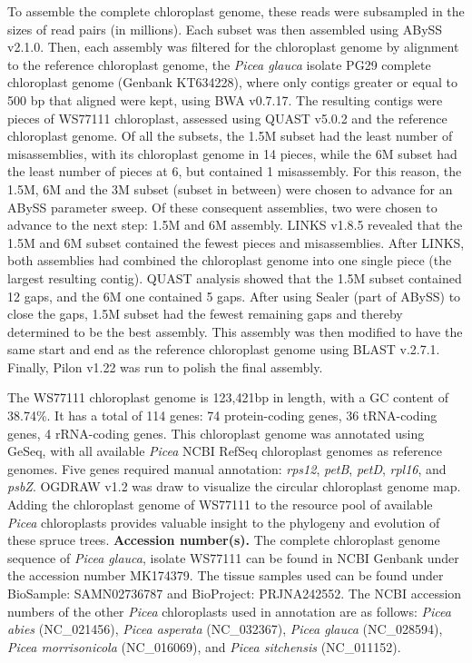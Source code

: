 \documentclass[titlepage,11pt, oneside]{article}   	%
\begin{document}
To assemble the complete chloroplast genome, these reads were subsampled in the sizes of read pairs (in millions). Each subset was then assembled using ABySS v2.1.0. Then, each assembly was filtered for the chloroplast genome by alignment to the reference chloroplast genome, the \textit{Picea glauca} isolate PG29 complete chloroplast genome (Genbank KT634228), where only contigs greater or equal to 500 bp that aligned were kept, using BWA v0.7.17. The resulting contigs were pieces of WS77111 chloroplast, assessed using QUAST v5.0.2 and the reference chloroplast genome. Of all the subsets, the 1.5M subset had the least number of misassemblies, with its chloroplast genome in 14 pieces, while the 6M subset had the least number of pieces at 6, but contained 1 misassembly. For this reason, the 1.5M, 6M and the 3M subset (subset in between) were chosen to advance for an ABySS parameter sweep. Of these consequent assemblies, two were chosen to advance to the next step: 1.5M and 6M assembly. LINKS v1.8.5 revealed that the 1.5M and 6M subset contained the fewest pieces and misassemblies. After LINKS, both assemblies had combined the chloroplast genome into one single piece (the largest resulting contig). QUAST analysis showed that the 1.5M subset contained 12 gaps, and the 6M one contained 5 gaps. After using Sealer (part of ABySS) to close the gaps, 1.5M subset had the fewest remaining gaps and thereby determined to be the best assembly. This assembly was then modified to have the same start and end as the reference chloroplast genome using BLAST v.2.7.1. Finally, Pilon v1.22 was run to polish the final assembly.
\newline
\par
The WS77111 chloroplast genome is 123,421bp in length, with a GC content of 38.74\%. It has a total of 114 genes: 74 protein-coding genes, 36 tRNA-coding genes, 4 rRNA-coding genes. This chloroplast genome was annotated using GeSeq, with all available \textit{Picea} NCBI RefSeq chloroplast genomes as reference genomes. Five genes required manual annotation: \textit{rps12}, \textit{petB}, \textit{petD}, \textit{rpl16}, and \textit{psbZ}. OGDRAW v1.2 was draw to visualize the circular chloroplast genome map. Adding the chloroplast genome of WS77111 to the resource pool of available \textit{Picea} chloroplasts provides valuable insight to the phylogeny and evolution of these spruce trees.
\newline
\newline
\textbf{Accession number(s).} The complete chloroplast genome sequence of \textit{Picea glauca}, isolate WS77111 can be found in NCBI Genbank under the accession number MK174379. The tissue samples used can be found under BioSample: SAMN02736787 and BioProject: PRJNA242552. The NCBI accession numbers of the other \textit{Picea} chloroplasts used in annotation are as follows: \textit{Picea abies} (NC\_021456), \textit{Picea asperata} (NC\_032367), \textit{Picea glauca} (NC\_028594), \textit{Picea morrisonicola} (NC\_016069), and \textit{Picea sitchensis }(NC\_011152).
\end{document}
